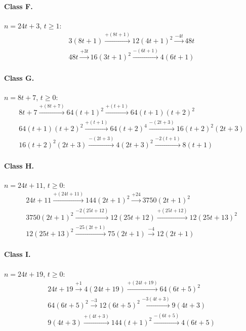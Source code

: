 \paragraph{Class F.} $n=24t+3$, $t\ge 1$:
\begin{gather*}
3 \left(8 t + 1\right) \xrightarrow{+\left(8 t + 1\right)} 12 \left(4 t + 1\right)^{2} \xrightarrow{-4 t} 48 t \\
48 t \xrightarrow{+3 t} 16 \left(3 t + 1\right)^{2} \xrightarrow{-\left(6 t + 1\right)} 4 \left(6 t + 1\right)
\end{gather*}
\paragraph{Class G.} $n=8t+7$, $t\ge 0$:
\begin{gather*}
8 t + 7 \xrightarrow{+\left(8 t + 7\right)} 64 \left(t + 1\right)^{2} \xrightarrow{+\left(t + 1\right)} 64 \left(t + 1\right) \left(t + 2\right)^{2} \\
64 \left(t + 1\right) \left(t + 2\right)^{2} \xrightarrow{+\left(t + 1\right)} 64 \left(t + 2\right)^{4} \xrightarrow{-\left(2 t + 3\right)} 16 \left(t + 2\right)^{2} \left(2 t + 3\right) \\
16 \left(t + 2\right)^{2} \left(2 t + 3\right) \xrightarrow{-\left(2 t + 3\right)} 4 \left(2 t + 3\right)^{2} \xrightarrow{-2 \left(t + 1\right)} 8 \left(t + 1\right)
\end{gather*}
\paragraph{Class H.} $n=24t+11$, $t\ge 0$:
\begin{gather*}
24 t + 11 \xrightarrow{+\left(24 t + 11\right)} 144 \left(2 t + 1\right)^{2} \xrightarrow{+24} 3750 \left(2 t + 1\right)^{2} \\
3750 \left(2 t + 1\right)^{2} \xrightarrow{-2 \left(25 t + 12\right)} 12 \left(25 t + 12\right) \xrightarrow{+\left(25 t + 12\right)} 12 \left(25 t + 13\right)^{2} \\
12 \left(25 t + 13\right)^{2} \xrightarrow{-25 \left(2 t + 1\right)} 75 \left(2 t + 1\right) \xrightarrow{-4} 12 \left(2 t + 1\right)
\end{gather*}
\paragraph{Class I.} $n=24t+19$, $t\ge 0$:
\begin{gather*}
24 t + 19 \xrightarrow{+1} 4 \left(24 t + 19\right) \xrightarrow{+\left(24 t + 19\right)} 64 \left(6 t + 5\right)^{2} \\
64 \left(6 t + 5\right)^{2} \xrightarrow{-3} 12 \left(6 t + 5\right)^{2} \xrightarrow{-3 \left(4 t + 3\right)} 9 \left(4 t + 3\right) \\
9 \left(4 t + 3\right) \xrightarrow{+\left(4 t + 3\right)} 144 \left(t + 1\right)^{2} \xrightarrow{-\left(6 t + 5\right)} 4 \left(6 t + 5\right)
\end{gather*}
